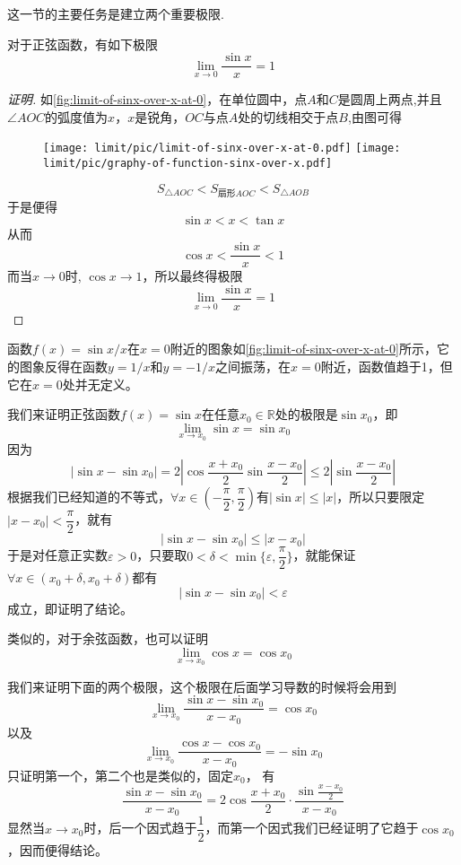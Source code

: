 这一节的主要任务是建立两个重要极限.

\begin{theorem}
  \label{theorem:sinx-over-x-to-1-when-x-to-0}
  对于正弦函数，有如下极限
  \[ \lim_{x \to 0} \frac{\sin{x}}{x} = 1 \]
\end{theorem}

\begin{proof}[证明]

  如\autoref{fig:limit-of-sinx-over-x-at-0}，在单位圆中，点$A$和$C$是圆周上两点,并且$\angle AOC$的弧度值为$x$，$x$是锐角，$OC$与点$A$处的切线相交于点$B$,由图可得
  
\begin{figure}[htbp]
\centering
\texttt{[image: limit/pic/limit-of-sinx-over-x-at-0.pdf]}
\texttt{[image: limit/pic/graphy-of-function-sinx-over-x.pdf]}
\caption{}
\label{fig:limit-of-sinx-over-x-at-0}
\end{figure}

  \[ S_{\triangle AOC} < S_{\text{扇形}AOC} < S_{\triangle AOB} \]
  于是便得
  \[ \sin{x} < x < \tan{x} \]
  从而
  \[ \cos{x} < \frac{\sin{x}}{x} < 1 \]
  而当$x \to 0$时, $\cos{x} \to 1$，所以最终得极限
  \[ \lim_{x \to 0} \frac{\sin{x}}{x} = 1 \]
\end{proof}

函数$f(x)=\sin{x}/x$在$x=0$附近的图象如\autoref{fig:limit-of-sinx-over-x-at-0}所示，它的图象反得在函数$y=1/x$和$y=-1/x$之间振荡，在$x=0$附近，函数值趋于1，但它在$x=0$处并无定义。

\begin{example}
  我们来证明正弦函数$f(x)=\sin{x}$在任意$x_0 \in \mathbb{R}$处的极限是$\sin{x_0}$，即
  \[ \lim_{x \to x_0} \sin{x} = \sin{x_0} \]
  因为
  \[ |\sin{x}-\sin{x_0}| = 2 \left| \cos{\frac{x+x_0}{2}} \sin{\frac{x-x_0}{2}} \right| \leqslant 2 \left| \sin{\frac{x-x_0}{2}} \right| \]
  根据我们已经知道的不等式，$\forall x \in \left(- \dfrac{\pi}{2}, \dfrac{\pi}{2} \right)$有$|\sin{x}| \leqslant |x|$，所以只要限定$|x-x_0|<\dfrac{\pi}{2}$，就有
  \[ |\sin{x}-\sin{x_0}| \leqslant |x-x_0| \]
  于是对任意正实数$\varepsilon>0$，只要取$0<\delta<\min\{\varepsilon, \dfrac{\pi}{2}\}$，就能保证$\forall x \in ( x_0+\delta,x_0+\delta )$都有
  \[ |\sin{x}-\sin{x_0}| < \varepsilon \]
  成立，即证明了结论。

  类似的，对于余弦函数，也可以证明
  \[ \lim_{x \to x_0} \cos{x} = \cos{x_0} \]
\end{example}

\begin{example}
  我们来证明下面的两个极限，这个极限在后面学习导数的时候将会用到
  \[ \lim_{x \to x_0} \frac{\sin{x}-\sin{x_0}}{x-x_0} = \cos{x_0} \]
  以及
  \[ \lim_{x \to x_0} \frac{\cos{x}-\cos{x_0}}{x-x_0} = -\sin{x_0} \]
  只证明第一个，第二个也是类似的，固定$x_0$，
  有
  \[ \frac{\sin{x}-\sin{x_0}}{x-x_0} = 2\cos{\frac{x+x_0}{2}} \cdot \frac{\sin{\frac{x-x_0}{2}}}{x-x_0} \]
  显然当$x \to x_0$时，后一个因式趋于$\dfrac{1}{2}$，而第一个因式我们已经证明了它趋于$\cos{x_0}$，因而便得结论。
\end{example}

